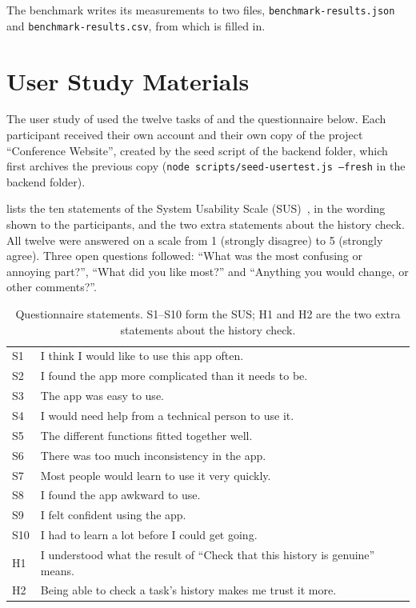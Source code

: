 The benchmark writes its measurements to two files, \texttt{benchmark-\allowbreak results.json} and \texttt{benchmark-\allowbreak results.csv}, from which  is filled in.

\section{User Study Materials}
\label{app:userstudy}

The user study of  used the twelve tasks of  and the questionnaire below. Each participant received their own account and their own copy of the project ``Conference Website'', created by the seed script of the backend folder, which first archives the previous copy (\texttt{node scripts/seed-usertest.js --fresh} in the backend folder).

 lists the ten statements of the System Usability Scale (SUS)~\cite{brooke1996sus}, in the wording shown to the participants, and the two extra statements about the history check. All twelve were answered on a scale from 1 (strongly disagree) to 5 (strongly agree). Three open questions followed: ``What was the most confusing or annoying part?'', ``What did you like most?'' and ``Anything you would change, or other comments?''.

\begin{table}[H]
    \centering
    \footnotesize
    \begin{tabular}{p{0.8cm}p{11.2cm}}
        \toprule
        S1& I think I would like to use this app often. \\
        S2 & I found the app more complicated than it needs to be. \\
        S3 & The app was easy to use. \\
        S4 & I would need help from a technical person to use it. \\
        S5 & The different functions fitted together well. \\
        S6 & There was too much inconsistency in the app. \\
        S7 & Most people would learn to use it very quickly. \\
        S8 & I found the app awkward to use. \\
        S9 & I felt confident using the app. \\
        S10 & I had to learn a lot before I could get going. \\
        \midrule
        H1 & I understood what the result of ``Check that this history is genuine'' means. \\
        H2 & Being able to check a task's history makes me trust it more. \\
        \bottomrule
    \end{tabular}
    \caption{Questionnaire statements. S1--S10 form the SUS; H1 and H2 are the two extra statements about the history check.}
    \label{tab:questionnaire}
\end{table}

